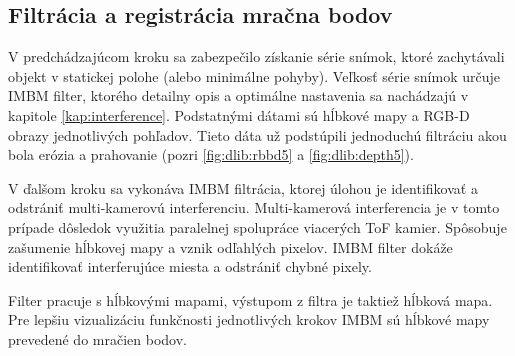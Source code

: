   

\subsection{Filtrácia a registrácia mračna bodov}
\label{sec:filtration}
V predchádzajúcom kroku sa zabezpečilo získanie série snímok, ktoré zachytávali objekt v statickej polohe (alebo minimálne pohyby). Veľkosť série snímok určuje IMBM filter, ktorého detailny opis a optimálne nastavenia sa nachádzajú v kapitole \ref{kap:interference}. Podstatnými dátami sú hĺbkové mapy a RGB-D obrazy jednotlivých pohľadov. Tieto dáta už podstúpili jednoduchú filtráciu akou bola erózia a prahovanie (pozri \ref{fig:dlib:rbbd5} a \ref{fig:dlib:depth5}). 

V ďalšom kroku sa vykonáva IMBM filtrácia, ktorej úlohou je identifikovať a odstrániť multi-kamerovú interferenciu. Multi-kamerová interferencia je v tomto prípade dôsledok využitia paralelnej spolupráce viacerých ToF kamier. Spôsobuje zašumenie hĺbkovej mapy a vznik odľahlých pixelov. IMBM filter dokáže identifikovať interferujúce miesta a odstrániť chybné pixely. 

Filter pracuje s hĺbkovými mapami, výstupom z filtra je taktiež hĺbková mapa. Pre lepšiu vizualizáciu funkčnosti jednotlivých krokov IMBM sú hĺbkové mapy prevedené do mračien bodov.  


